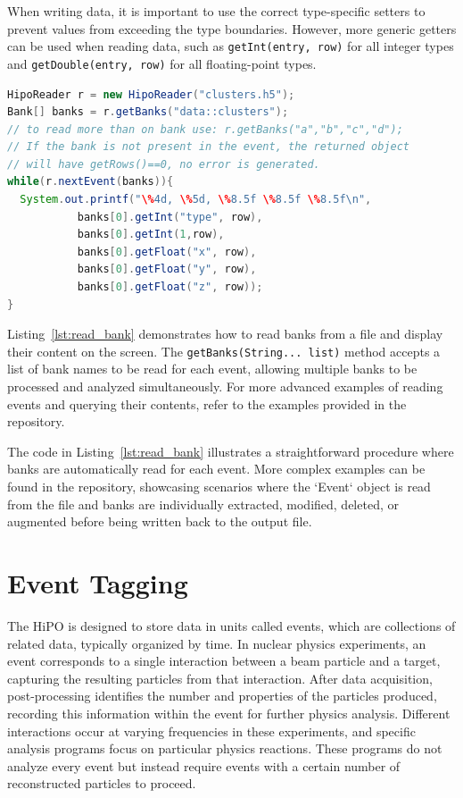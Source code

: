 \documentclass[preprint,12pt]{elsarticle}
\begin{document}
When writing data, it is important to use the correct type-specific setters to prevent values from exceeding the type boundaries. However, more generic getters can be used when reading data, such as {\tt getInt(entry, row)} for all integer types and {\tt getDouble(entry, row)} for all floating-point types.

\begin{lstlisting}[language=java, caption=Java example to read banks from the file, label=lst:read_bank]
HipoReader r = new HipoReader("clusters.h5");        
Bank[] banks = r.getBanks("data::clusters");
// to read more than on bank use: r.getBanks("a","b","c","d");
// If the bank is not present in the event, the returned object 
// will have getRows()==0, no error is generated.
while(r.nextEvent(banks)){
  System.out.printf("\%4d, \%5d, \%8.5f \%8.5f \%8.5f\n",
           banks[0].getInt("type", row),
           banks[0].getInt(1,row),
           banks[0].getFloat("x", row),
           banks[0].getFloat("y", row),
           banks[0].getFloat("z", row));
}
\end{lstlisting}

Listing~\ref{lst:read_bank} demonstrates how to read banks from a file and display their content on the screen. The {\tt getBanks(String... list)} method accepts a list of bank names to be read for each event, allowing multiple banks to be processed and analyzed simultaneously. For more advanced examples of reading events and querying their contents, refer to the examples provided in the repository.

The code in Listing~\ref{lst:read_bank} illustrates a straightforward procedure where banks are automatically read for each event. More complex examples can be found in the repository, showcasing scenarios where the `Event` object is read from the file and banks are individually extracted, modified, deleted, or augmented before being written back to the output file.

\section{Event Tagging}


The HiPO is designed to store data in units called events, which are collections of related data, typically organized by time. In nuclear physics experiments, an event corresponds to a single interaction between a beam particle and a target, capturing the resulting particles from that interaction. After data acquisition, post-processing identifies the number and properties of the particles produced, recording this information within the event for further physics analysis. Different interactions occur at varying frequencies in these experiments, and specific analysis programs focus on particular physics reactions. These programs do not analyze every event but instead require events with a certain number of reconstructed particles to proceed.
\end{document}
